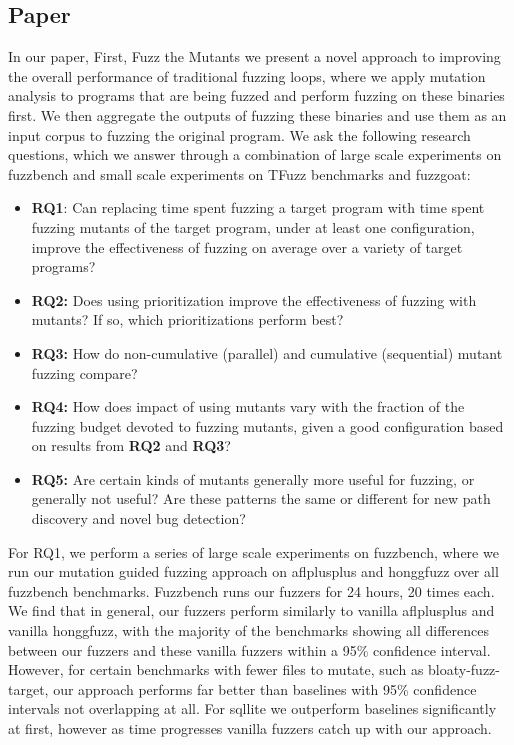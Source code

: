 \documentclass[manuscript,screen,review]{acmart}
\begin{document}

\maketitle

\subsection{Paper}
In our paper, First, Fuzz the Mutants we present a novel approach to improving the overall performance of traditional fuzzing loops, where 
we apply mutation analysis to programs that are being fuzzed and perform fuzzing on these binaries first. We then aggregate the outputs of
fuzzing these binaries and use them as an input corpus to fuzzing the original program. We ask the following research questions, which we answer
through a combination of large scale experiments on fuzzbench and small scale experiments on TFuzz benchmarks and fuzzgoat:
\begin{itemize}
    \item {\bf RQ1}: Can replacing time spent fuzzing a target program with time spent fuzzing mutants of the target program, under at least one configuration, improve
    the effectiveness of fuzzing on average over a variety of target programs?
    \item {\bf RQ2:} Does using prioritization improve the effectiveness of fuzzing with mutants?  If so, which prioritizations perform best?
    \item {\bf RQ3:} How do non-cumulative (parallel) and cumulative (sequential) mutant fuzzing compare?
    \item {\bf RQ4:} How does impact of using mutants vary with the fraction of the fuzzing budget devoted to fuzzing mutants, given a good configuration based on results from {\bf RQ2} and {\bf RQ3}?
    \item {\bf RQ5:} Are certain kinds of mutants generally more useful for fuzzing, or generally not useful?  Are these patterns the same or different for new path discovery and novel bug detection?
\end{itemize}

For RQ1, we perform a series of large scale experiments on fuzzbench, where we run our mutation guided fuzzing approach on aflplusplus and honggfuzz over all fuzzbench benchmarks. Fuzzbench runs our
fuzzers for 24 hours, 20 times each. We find that in general, our fuzzers perform similarly to vanilla aflplusplus and vanilla honggfuzz, with the majority of the benchmarks showing all differences between
our fuzzers and these vanilla fuzzers within a 95\% confidence interval. However, for certain benchmarks with fewer files to mutate, such as bloaty-fuzz-target, our approach performs far better than baselines
with 95\% confidence intervals not overlapping at all. For sqllite we outperform baselines significantly at first, however as time progresses vanilla fuzzers catch up with our approach.
\end{document}
